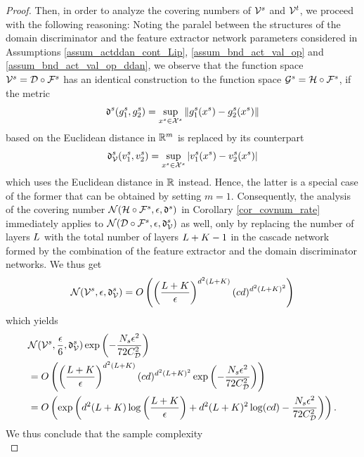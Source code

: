\documentclass[review,supplement,onefignum,onetabnum]{siamonline250211}
\begin{document}
\begin{proof}
Then, in order to analyze the covering numbers of $\mathcal{V}^s$ and $\mathcal{V}^t$, we proceed with the following reasoning: Noting the paralel between the structures of the domain discriminator and the feature extractor network parameters considered in Assumptions \ref{assum_actddan_cont_Lip}, \ref{assum_bnd_act_val_op} and \ref{assum_bnd_act_val_op_ddan}, we observe that the function space $\mathcal{V}^s=\mathcal{D} \circ \mathcal{F}^s$ has an identical construction to the function space $\mathcal{G}^s=\mathcal{H} \circ \mathcal{F}^s$, if the metric 
\[
\mathfrak{d}^s(g^s_1, g^s_2) = \sup_{x^s \in \mathcal{X}^s}  \| g^s_1(x^s) - g^s_2(x^s) \|
\]
based on the Euclidean distance in $\mathbb{R}^{m}$ is replaced by its counterpart
%
\[
\mathfrak{d}^s_{\mathcal{V}} (v^s_1, v^s_2) = \sup_{x^s \in \mathcal{X}^s}  | v^s_1(x^s) - v^s_2(x^s) | 
\]
%
which uses the Euclidean distance in $\mathbb{R}$ instead. Hence, the latter is a special case of the former that can be obtained by setting $m=1$. Consequently, the analysis of the covering number $\mathcal{N} ( \mathcal{H} \circ \mathcal{F}^s, \epsilon, \mathfrak{d}^s) $  in Corollary \ref{cor_covnum_rate} immediately applies to $\mathcal{N} ( \mathcal{D} \circ \mathcal{F}^s, \epsilon, \mathfrak{d}^s_{\mathcal{V}} ) $ as well, only by replacing the number of layers $L$ with the total number of layers $L+K -1$ in the cascade network formed by the combination of the feature extractor and the domain discriminator networks. We thus get
%
\begin{equation*}
\begin{split}
\mathcal{N} (  \mathcal{V}^s, \epsilon, \mathfrak{d}^s_{\mathcal{V}} ) 
 = O\left( \left( \frac{  L + K}{\epsilon}  \right)^{{d}^2 (L+ K)}   (c {d})^{{d}^2 (L + K)^2} \right)
\end{split}
\end{equation*}
%
which yields
%
\begin{equation}
\label{eq_NVs_exp}
\begin{split}
&\mathcal{N}(\mathcal{V}^s, \frac{\epsilon}{6}, \mathfrak{d}^s_{\mathcal{V}} )  \exp \left( -\frac{N_s \epsilon^2}{72 {C^2_{\mathcal{D}}}} \right) \\
&=
O\left( \left( \frac{  L + K}{\epsilon}  \right)^{{d}^2 (L+ K)}   (c {d})^{{d}^2 (L + K)^2}
\exp \left( -\frac{N_s \epsilon^2}{72 {C^2_{\mathcal{D}}}} \right) 
 \right) \\
 &=
 O\left( 
 \exp \left(
  {d}^2 (L+ K) \log \left( \frac{  L + K}{\epsilon}  \right)       
 +
  {d}^2 (L + K)^2 \log(c {d}) 
 -
  \frac{N_s \epsilon^2}{72 {C^2_{\mathcal{D}}}} 
 \right)
 \right).
\end{split}
\end{equation}
%
We thus conclude that the sample complexity
%
\begin{equation*}

\end{equation*}
\end{proof}
\end{document}
